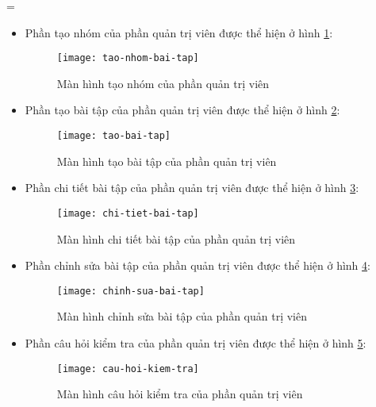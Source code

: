 =\documentclass[../Thesis.tex]{subfiles}
\begin{document}
\begin{itemize}
                \item Phần tạo nhóm của phần quản trị viên được thể hiện ở hình \ref{fig:tao-nhom-bai-tap}:
                \begin{figure}[hbt!]
                    \centering\texttt{[image: tao-nhom-bai-tap]}
                    \caption{Màn hình tạo nhóm của phần quản trị viên}
                    \label{fig:tao-nhom-bai-tap}
                \end{figure}
                \FloatBarrier

                \item Phần tạo bài tập của phần quản trị viên được thể hiện ở hình \ref{fig:tao-bai-tap}:
                \begin{figure}[hbt!]
                    \centering\texttt{[image: tao-bai-tap]}
                    \caption{Màn hình tạo bài tập của phần quản trị viên}
                    \label{fig:tao-bai-tap}
                \end{figure}
                \FloatBarrier

                \item Phần chi tiết bài tập của phần quản trị viên được thể hiện ở hình \ref{fig:chi-tiet-bai-tap}:
                \begin{figure}[hbt!]
                    \centering\texttt{[image: chi-tiet-bai-tap]}
                    \caption{Màn hình chi tiết bài tập của phần quản trị viên}
                    \label{fig:chi-tiet-bai-tap}
                \end{figure}
                \FloatBarrier

                \item Phần chỉnh sửa bài tập của phần quản trị viên được thể hiện ở hình \ref{fig:chinh-sua-bai-tap}:
                \begin{figure}[hbt!]
                    \centering\texttt{[image: chinh-sua-bai-tap]}
                    \caption{Màn hình chỉnh sửa bài tập của phần quản trị viên}
                    \label{fig:chinh-sua-bai-tap}
                \end{figure}
                \FloatBarrier

                \item Phần câu hỏi kiểm tra của phần quản trị viên được thể hiện ở hình \ref{fig:cau-hoi-kiem-tra}:
                \begin{figure}[hbt!]
                    \centering\texttt{[image: cau-hoi-kiem-tra]}
                    \caption{Màn hình câu hỏi kiểm tra của phần quản trị viên}
                    \label{fig:cau-hoi-kiem-tra}
                \end{figure}
                \FloatBarrier


\end{itemize}
\end{document}

